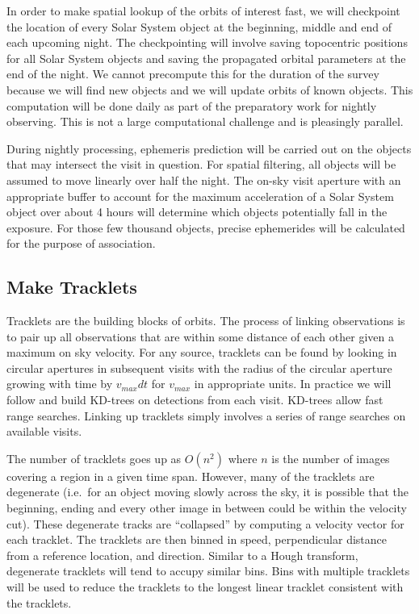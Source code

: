 In order to make spatial lookup of the orbits of interest fast, we will checkpoint the location of every Solar System object at the beginning, middle and end of each upcoming night.  The checkpointing will involve saving topocentric positions for all Solar System objects and saving the propagated orbital parameters at the end of the night.  We cannot precompute this for the duration of the survey because we will find new objects and we will update orbits of known objects.  This computation will be done daily as part of the preparatory work for nightly observing.  This is not a large computational challenge and is pleasingly parallel.

During nightly processing, ephemeris prediction will be carried out on the objects that may intersect the visit in question.  For spatial filtering, all objects will be assumed to move linearly over half the night.  The on-sky visit aperture with an appropriate buffer to account for the maximum acceleration of a Solar System object over about 4 hours will determine which objects potentially fall in the exposure.  For those few thousand objects, precise ephemerides will be calculated for the purpose of association.

\subsection{Make Tracklets}
\label{sec:acMakeTracklets}
Tracklets are the building blocks of orbits.  The process of linking observations is to pair up all observations that are within some distance of each other given a maximum on sky velocity.  For any source, tracklets can be found by looking in circular apertures in subsequent visits with the radius of the circular aperture growing with time by $v_{max}dt$ for $v_{max}$ in appropriate units.  In practice we will follow \cite{kubica05} and build KD-trees on detections from each visit.  KD-trees allow fast range searches.  Linking up tracklets simply involves a series of range searches on available visits.

The number of tracklets goes up as $O(n^2)$ where $n$ is the number of images covering a region in a given time span.  However, many of the tracklets are degenerate (i.e.\ for an object moving slowly across the sky, it is possible that the beginning, ending and every other image in between could be within the velocity cut). These degenerate tracks are ``collapsed'' by computing a velocity vector for each tracklet.  The tracklets are then binned in speed, perpendicular distance from a reference location, and direction.  Similar to a Hough transform, degenerate tracklets will tend to accupy similar bins.  Bins with multiple tracklets will be used to reduce the tracklets to the longest linear tracklet consistent with the tracklets.

